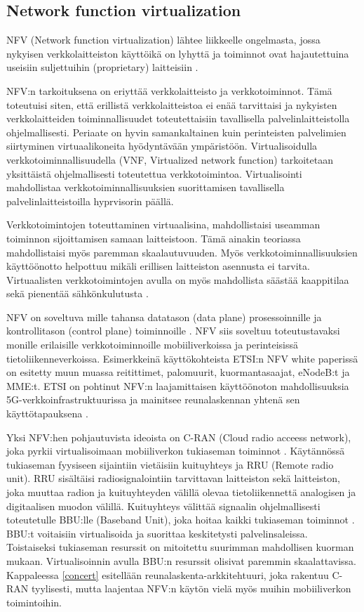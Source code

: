 \subsection{Network function virtualization} \label{nfv}
NFV (Network function virtualization) lähtee liikkeelle ongelmasta, jossa nykyisen verkkolaitteiston käyttöikä on lyhyttä ja toiminnot ovat hajautettuina useisiin suljettuihin (proprietary) laitteisiin \cite{nfvwhite}. 

NFV:n tarkoituksena on eriyttää verkkolaitteisto ja verkkotoiminnot. Tämä toteutuisi siten, että erillistä verkkolaitteistoa ei enää tarvittaisi ja nykyisten verkkolaitteiden toiminnallisuudet toteutettaisiin tavallisella palvelinlaitteistolla ohjelmallisesti. Periaate on hyvin samankaltainen kuin perinteisten palvelimien siirtyminen virtuaalikoneita hyödyntävään ympäristöön.
Virtualisoidulla verkkotoiminnallisuudella (VNF, Virtualized network function) tarkoitetaan yksittäistä ohjelmallisesti toteutettua verkkotoimintoa. Virtualisointi mahdollistaa verkkotoiminnallisuuksien suorittamisen tavallisella palvelinlaitteistoilla hyprvisorin päällä. 

Verkkotoimintojen toteuttaminen virtuaalisina, mahdollistaisi useamman toiminnon sijoittamisen samaan laitteistoon. Tämä ainakin teoriassa mahdollistaisi myös paremman skaalautuvuuden. Myös verkkotoiminnallisuuksien käyttöönotto helpottuu mikäli erillisen laitteiston asennusta ei tarvita. Virtuaalisten verkkotoimintojen avulla on myös mahdollista säästää kaappitilaa sekä pienentää sähkönkulutusta \cite{nfvedge}.

NFV on soveltuva mille tahansa datatason (data plane) prosessoinnille ja kontrollitason (control plane) toiminnoille \cite{nfvwhite}. NFV siis soveltuu toteutustavaksi monille erilaisille verkkotoiminnoille mobiiliverkoissa ja perinteisissä tietoliikenneverkoissa. Esimerkkeinä käyttökohteista ETSI:n NFV white paperissä on esitetty muun muassa reitittimet, palomuurit, kuormantasaajat, eNodeB:t ja MME:t. ETSI on pohtinut NFV:n laajamittaisen käyttöönoton mahdollisuuksia 5G-verkkoinfrastruktuurissa ja mainitsee reunalaskennan yhtenä sen käyttötapauksena \cite{etsinfv5g}.

Yksi NFV:hen pohjautuvista ideoista on C-RAN (Cloud radio acceess network), joka pyrkii virtualisoimaan mobiiliverkon tukiaseman toiminnot \cite{chih2014recent}. Käytännössä tukiaseman fyysiseen sijaintiin vietäisiin kuituyhteys ja RRU (Remote radio unit).
RRU sisältäisi radiosignalointiin tarvittavan laitteiston sekä laitteiston, joka muuttaa radion ja kuituyhteyden välillä olevaa tietoliikennettä analogisen ja digitaalisen muodon välillä.
Kuituyhteys välittää signaalin ohjelmallisesti toteutetulle BBU:lle (Baseband Unit), joka hoitaa kaikki tukiaseman toiminnot \cite{chih2014recent}.
BBU:t voitaisiin virtualisoida ja suorittaa keskitetysti palvelinsaleissa.
Toistaiseksi tukiaseman resurssit on mitoitettu suurimman mahdollisen kuorman mukaan. Virtualisoinnin avulla BBU:n resurssit olisivat paremmin skaalattavissa.
Kappaleessa \ref{concert} esitellään reunalaskenta-arkkitehtuuri, joka rakentuu C-RAN tyylisesti, mutta laajentaa NFV:n käytön vielä myös muihin mobiiliverkon toimintoihin.

